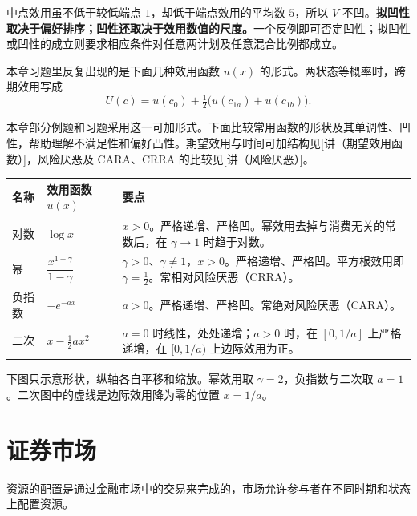 中点效用虽不低于较低端点 $1$，却低于端点效用的平均数 $5$，所以 $V$ 不凹。\textbf{拟凹性取决于偏好排序；凹性还取决于效用数值的尺度。}一个反例即可否定凹性；拟凹性或凹性的成立则要求相应条件对任意两计划及任意混合比例都成立。


\begin{tcolorbox}[knowledge,title=补充知识：常用效用函数]
本章习题里反复出现的是下面几种效用函数 $u(x)$ 的形式。两状态等概率时，跨期效用写成
\[
    U(c)=u(c_0)+\tfrac12\bigl(u(c_{1a})+u(c_{1b})\bigr).
\]

本章部分例题和习题采用这一可加形式。下面比较常用函数的形状及其单调性、凹性，帮助理解不满足性和偏好凸性。期望效用与时间可加结构见[讲（期望效用函数）]，风险厌恶及 CARA、CRRA 的比较见[讲（风险厌恶）]。

{\small
\renewcommand{\arraystretch}{1.25}
\noindent\begin{tabularx}{\linewidth}{@{}llX@{}}
\toprule
名称 & 效用函数 $u(x)$ & 要点 \\
\midrule
对数 & $\log x$ & $x>0$。严格递增、严格凹。幂效用去掉与消费无关的常数后，在 $\gamma\to1$ 时趋于对数。 \\
幂 & $\dfrac{x^{1-\gamma}}{1-\gamma}$ & $\gamma>0$、$\gamma\neq 1$，$x>0$。严格递增、严格凹。平方根效用即 $\gamma=\tfrac12$。常相对风险厌恶（CRRA）。 \\
负指数 & $-e^{-ax}$ & $a>0$。严格递增、严格凹。常绝对风险厌恶（CARA）。 \\
二次 & $x-\tfrac12 a x^{2}$ & $a=0$ 时线性，处处递增；$a>0$ 时，在 $[0,1/a]$ 上严格递增，在 $[0,1/a)$ 上边际效用为正。 \\
\bottomrule
\end{tabularx}}

下图只示意形状，纵轴各自平移和缩放。幂效用取 $\gamma=2$，负指数与二次取 $a=1$。二次图中的虚线是边际效用降为零的位置 $x=1/a$。
\begin{center}
\setlength{\tabcolsep}{2pt}
\footnotesize
{}%
\end{center}
\end{tcolorbox}

\section{证券市场}

资源的配置是通过金融市场中的交易来完成的，市场允许参与者在不同时期和状态上配置资源。

